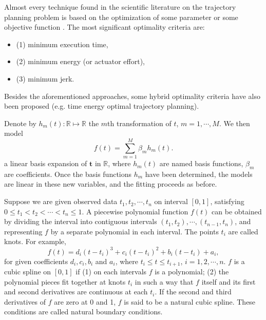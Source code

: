 Almost every technique found in the scientific literature on the trajectory planning problem is based on the optimization of some parameter or some objective function \cite{gasparetto2007new}. The most significant optimality criteria are: 
\begin{itemize}
\item (1) minimum execution time,
\item (2) minimum energy (or actuator effort),
\item (3) minimum jerk.
\end{itemize}
Besides the aforementioned approaches, some hybrid optimality criteria have also been proposed (e.g. time energy optimal trajectory planning).


Denote by $h_m(t):\mathbb{R} \mapsto \mathbb{R}$ the $m$th transformation of $t$, $m =1, \cdots ,M$. We then model
\begin{equation}\label{fbasis}
f(t) =\sum_{m=1}^{M}\beta_mh_m(t).
\end{equation}
a linear basis expansion of $\mathbf{t}$ in $\mathbb{R}$, where $h_m(t)$ are named basis functions, $\beta_m$ are coefficients. Once the basis functions $h_m$ have been determined, the models are linear in these new variables, and the fitting proceeds as before.

Suppose we are given observed data $t_1,t_2, \cdots, t_n$ on interval $[0,1]$, satisfying $0\leq t_1< t_2 < \cdots <t_n \leq 1$. A piecewise polynomial function $f(t)$ can be obtained by dividing the interval into contiguous
intervals $(t_1,t_2),\cdots,(t_{n-1},t_n)$, and representing $f$ by a separate polynomial in each interval. The points $t_i$ are called knots. For example,
\begin{equation}
f(t)=d_i(t-t_i)^3+c_i(t-t_i)^2+b_i(t-t_i)+a_i,
\end{equation}
for given coefficients $d_i, c_i, b_i$ and $a_i$, where $t_i\leq t\leq t_{i+1}$, $i=1,2,\cdots,n$. $f$ is a cubic spline on $[0,1]$ if (1) on each intervals $f$ is a polynomial; (2) the polynomial pieces fit together at knots $t_i$ in such a way that $f$ itself and its first and second derivatives are continuous at each $t_i$. If the second and third derivatives of $f$ are zero at 0 and 1, $f$ is said to be a natural cubic spline. These conditions are called natural boundary conditions.

